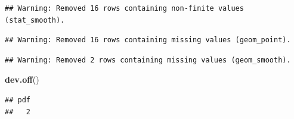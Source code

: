 \documentclass[]{article}
\newenvironment{Shaded}{\begin{snugshade}}{\end{snugshade}}
\newcommand{\KeywordTok}[1]{\textcolor[rgb]{0.13,0.29,0.53}{\textbf{#1}}}
\newcommand{\NormalTok}[1]{#1}
\begin{document}
\begin{verbatim}
## Warning: Removed 16 rows containing non-finite values (stat_smooth).
\end{verbatim}

\begin{verbatim}
## Warning: Removed 16 rows containing missing values (geom_point).
\end{verbatim}

\begin{verbatim}
## Warning: Removed 2 rows containing missing values (geom_smooth).
\end{verbatim}

\begin{Shaded}
\begin{Highlighting}[]
\KeywordTok{dev.off}\NormalTok{()}
\end{Highlighting}
\end{Shaded}

\begin{verbatim}
## pdf 
##   2
\end{verbatim}
\end{document}
